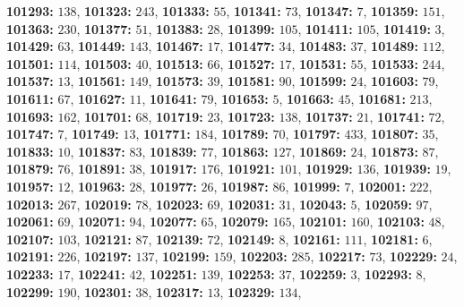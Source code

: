 \textsf{\bfseries 101293:} $138$, \textsf{\bfseries 101323:} $243$, \textsf{\bfseries 101333:} $55$, \textsf{\bfseries 101341:} $73$, \textsf{\bfseries 101347:} $7$, \textsf{\bfseries 101359:} $151$, \textsf{\bfseries 101363:} $230$, \textsf{\bfseries 101377:} $51$, \textsf{\bfseries 101383:} $28$, \textsf{\bfseries 101399:} $105$, \textsf{\bfseries 101411:} $105$, \textsf{\bfseries 101419:} $3$, \textsf{\bfseries 101429:} $63$, \textsf{\bfseries 101449:} $143$, \textsf{\bfseries 101467:} $17$, \textsf{\bfseries 101477:} $34$, \textsf{\bfseries 101483:} $37$, \textsf{\bfseries 101489:} $112$, \textsf{\bfseries 101501:} $114$, \textsf{\bfseries 101503:} $40$, \textsf{\bfseries 101513:} $66$, \textsf{\bfseries 101527:} $17$, \textsf{\bfseries 101531:} $55$, \textsf{\bfseries 101533:} $244$, \textsf{\bfseries 101537:} $13$, \textsf{\bfseries 101561:} $149$, \textsf{\bfseries 101573:} $39$, \textsf{\bfseries 101581:} $90$, \textsf{\bfseries 101599:} $24$, \textsf{\bfseries 101603:} $79$, \textsf{\bfseries 101611:} $67$, \textsf{\bfseries 101627:} $11$, \textsf{\bfseries 101641:} $79$, \textsf{\bfseries 101653:} $5$, \textsf{\bfseries 101663:} $45$, \textsf{\bfseries 101681:} $213$, \textsf{\bfseries 101693:} $162$, \textsf{\bfseries 101701:} $68$, \textsf{\bfseries 101719:} $23$, \textsf{\bfseries 101723:} $138$, \textsf{\bfseries 101737:} $21$, \textsf{\bfseries 101741:} $72$, \textsf{\bfseries 101747:} $7$, \textsf{\bfseries 101749:} $13$, \textsf{\bfseries 101771:} $184$, \textsf{\bfseries 101789:} $70$, \textsf{\bfseries 101797:} $433$, \textsf{\bfseries 101807:} $35$, \textsf{\bfseries 101833:} $10$, \textsf{\bfseries 101837:} $83$, \textsf{\bfseries 101839:} $77$, \textsf{\bfseries 101863:} $127$, \textsf{\bfseries 101869:} $24$, \textsf{\bfseries 101873:} $87$, \textsf{\bfseries 101879:} $76$, \textsf{\bfseries 101891:} $38$, \textsf{\bfseries 101917:} $176$, \textsf{\bfseries 101921:} $101$, \textsf{\bfseries 101929:} $136$, \textsf{\bfseries 101939:} $19$, \textsf{\bfseries 101957:} $12$, \textsf{\bfseries 101963:} $28$, \textsf{\bfseries 101977:} $26$, \textsf{\bfseries 101987:} $86$, \textsf{\bfseries 101999:} $7$, \textsf{\bfseries 102001:} $222$, \textsf{\bfseries 102013:} $267$, \textsf{\bfseries 102019:} $78$, \textsf{\bfseries 102023:} $69$, \textsf{\bfseries 102031:} $31$, \textsf{\bfseries 102043:} $5$, \textsf{\bfseries 102059:} $97$, \textsf{\bfseries 102061:} $69$, \textsf{\bfseries 102071:} $94$, \textsf{\bfseries 102077:} $65$, \textsf{\bfseries 102079:} $165$, \textsf{\bfseries 102101:} $160$, \textsf{\bfseries 102103:} $48$, \textsf{\bfseries 102107:} $103$, \textsf{\bfseries 102121:} $87$, \textsf{\bfseries 102139:} $72$, \textsf{\bfseries 102149:} $8$, \textsf{\bfseries 102161:} $111$, \textsf{\bfseries 102181:} $6$, \textsf{\bfseries 102191:} $226$, \textsf{\bfseries 102197:} $137$, \textsf{\bfseries 102199:} $159$, \textsf{\bfseries 102203:} $285$, \textsf{\bfseries 102217:} $73$, \textsf{\bfseries 102229:} $24$, \textsf{\bfseries 102233:} $17$, \textsf{\bfseries 102241:} $42$, \textsf{\bfseries 102251:} $139$, \textsf{\bfseries 102253:} $37$, \textsf{\bfseries 102259:} $3$, \textsf{\bfseries 102293:} $8$, \textsf{\bfseries 102299:} $190$, \textsf{\bfseries 102301:} $38$, \textsf{\bfseries 102317:} $13$, \textsf{\bfseries 102329:} $134$, 
